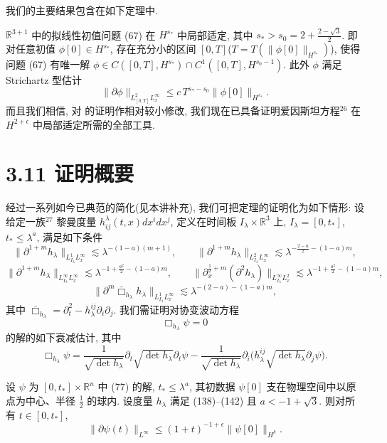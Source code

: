 我们的主要结果包含在如下定理中.
\setcounter{mtthm}{9}
\begin{theorem}\label{thm:3.10}
$\mathbb{R}^{3+1}$ 中的拟线性初值问题 (67) 在 $H^{s_*}$ 中局部适定, 其中 $s_* > s_0 = 2 + \frac{2 - \sqrt{3}}{2}$. 即对任意初值 $\phi[0] \in H^{s_*}$, 存在充分小的区间 $[0, T]$($T = T(\|\phi[0]\|_{H^{s_*}})$), 使得问题 (67) 有唯一解 $\phi \in C([0, T], H^{s_*})\cap C^{1}([0, T], H^{s_0-1})$. 此外 $\phi$ 满足 Strichartz 型估计
\[
\|\partial\phi\|_{L_{[0,T]}^{2}L_{x}^{\infty}}\leq c\, T^{s_{*}-s_{0}}\|\phi[0]\|_{H^{s_{*}}}.
\]
而且我们相信, 对 \cite{klai42} 的证明作相对较小修改, 我们现在已具备证明爱因斯坦方程$^{26}$ 在 $H^{2+\epsilon}$ 中局部适定所需的全部工具.\end{theorem}

\section*{3.11  证明概要}

经过一系列如今已典范的简化(见本讲补充), 我们可把定理的证明化为如下情形:
设给定一族$^{27}$ 黎曼度量 $h_{ij}^{\lambda}(t,x)dx^{i}dx^{j}$, 定义在时间板 $I_{\lambda} \times \mathbb{R}^{3}$ 上, $I_{\lambda} = [0, t_{*}]$, $t_{*} \leq \lambda^{a}$, 满足如下条件
\[
\|\partial^{1+m}h_{\lambda}\|_{L_{I_{\lambda}}^{1}L_{x}^{\infty}}\lesssim\lambda^{-(1-a)(m+1)},\qquad
\|\partial^{1+m}h_{\lambda}\|_{L_{I_{\lambda}}^{2}L_{x}^{\infty}}\lesssim\lambda^{-\frac{2-a}{2}-(1-a)m},
\]
\[
\|\partial^{1+m}h_{\lambda}\|_{L_{I_{\lambda}}^{\infty}L_{x}^{\infty}}\lesssim\lambda^{-1+\frac{a^{2}}{2}-(1-a)m},\qquad
\|\partial_{x}^{\frac{1}{2}+m}(\partial^{2}h_{\lambda})\|_{L_{I_{\lambda}}^{\infty}L_{x}^{2}}\lesssim\lambda^{-1+\frac{a^{2}}{2}-(1-a)m},
\]
\[
\|\partial^{m}\bar{\Box}_{h_{\lambda}}h_{\lambda}\|_{L_{I_{\lambda}}^{1}L_{x}^{\infty}}\lesssim\lambda^{-(2-a)-(1-a)m},
\]
其中 $\bar{\Box}_{h_{\lambda}} = \partial_{t}^{2} - h_{\lambda}^{ij} \partial_{i} \partial_{j}$. 我们需证明对协变波动方程
\[
\Box_{h_{\lambda}}\psi=0
\]
的解的如下衰减估计, 其中
\[
\Box_{h_{\lambda}}\psi=\frac{1}{\sqrt{\det h_{\lambda}}}\partial_{t}\sqrt{\det h_{\lambda}}\partial_{t}\psi-\frac{1}{\sqrt{\det h_{\lambda}}}\partial_{i}\bigl(h_{\lambda}^{i j}\sqrt{\det h_{\lambda}}\partial_{j}\psi\bigr).
\]

\setcounter{mtthm}{11}
\begin{theorem}\label{thm:3.12}
设 $\psi$ 为 $[0, t_*] \times \mathbb{R}^n$ 中 (77) 的解, $t_* \leq \lambda^a$, 其初数据 $\psi[0]$ 支在物理空间中以原点为中心、半径 $\frac{1}{2}$ 的球内. 设度量 $h_\lambda$ 满足 (138)--(142) 且 $a < -1 + \sqrt{3}$. 则对所有 $t \in [0, t_*]$,
\[
\|\partial\psi(t)\|_{L^{\infty}}\leq(1+t)^{-1+\epsilon}\|\psi[0]\|_{H^{k}}.
\]
\end{theorem}

